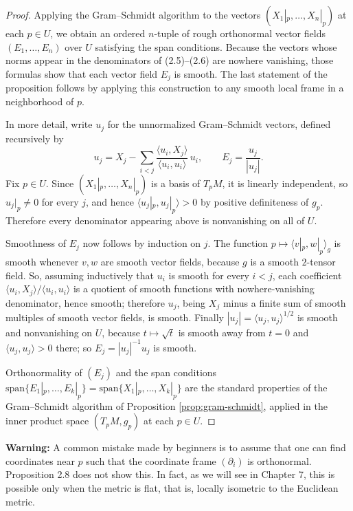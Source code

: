 \begin{proof}
\leanok
{}
Applying the Gram–Schmidt algorithm to the vectors $(X_1|_p, \ldots, X_n|_p)$ at each $p \in U$, we obtain an ordered $n$-tuple of rough orthonormal vector fields $(E_1, \ldots, E_n)$ over $U$ satisfying the span conditions. Because the vectors whose norms appear in the denominators of (2.5)–(2.6) are nowhere vanishing, those formulas show that each vector field $E_j$ is smooth. The last statement of the proposition follows by applying this construction to any smooth local frame in a neighborhood of $p$.

In more detail, write $u_j$ for the unnormalized Gram–Schmidt vectors, defined recursively by
\[
u_j = X_j - \sum_{i < j} \frac{\langle u_i, X_j\rangle}{\langle u_i, u_i\rangle}\, u_i ,
\qquad E_j = \frac{u_j}{|u_j|} .
\]
Fix $p \in U$. Since $(X_1|_p, \ldots, X_n|_p)$ is a basis of $T_pM$, it is linearly independent, so $u_j|_p \neq 0$ for every $j$, and hence $\langle u_j|_p, u_j|_p\rangle > 0$ by positive definiteness of $g_p$. Therefore every denominator appearing above is nonvanishing on all of $U$.

Smoothness of $E_j$ now follows by induction on $j$. The function $p \mapsto \langle v|_p, w|_p\rangle_g$ is smooth whenever $v, w$ are smooth vector fields, because $g$ is a smooth $2$-tensor field. So, assuming inductively that $u_i$ is smooth for every $i < j$, each coefficient $\langle u_i, X_j\rangle / \langle u_i, u_i\rangle$ is a quotient of smooth functions with nowhere-vanishing denominator, hence smooth; therefore $u_j$, being $X_j$ minus a finite sum of smooth multiples of smooth vector fields, is smooth. Finally $|u_j| = \langle u_j, u_j\rangle^{1/2}$ is smooth and nonvanishing on $U$, because $t \mapsto \sqrt{t}$ is smooth away from $t = 0$ and $\langle u_j, u_j\rangle > 0$ there; so $E_j = |u_j|^{-1} u_j$ is smooth.

Orthonormality of $(E_j)$ and the span conditions $\text{span}\{E_1|_p, \ldots, E_k|_p\} = \text{span}\{X_1|_p, \ldots, X_k|_p\}$ are the standard properties of the Gram–Schmidt algorithm of Proposition \ref{prop:gram-schmidt}, applied in the inner product space $(T_pM, g_p)$ at each $p \in U$.
\end{proof}

\begin{remark}
\label{rem:coordinate-frame-warning}

\textbf{Warning:} A common mistake made by beginners is to assume that one can find coordinates near $p$ such that the coordinate frame $(\partial_i)$ is orthonormal. Proposition 2.8 does not show this. In fact, as we will see in Chapter 7, this is possible only when the metric is flat, that is, locally isometric to the Euclidean metric.
\end{remark}

